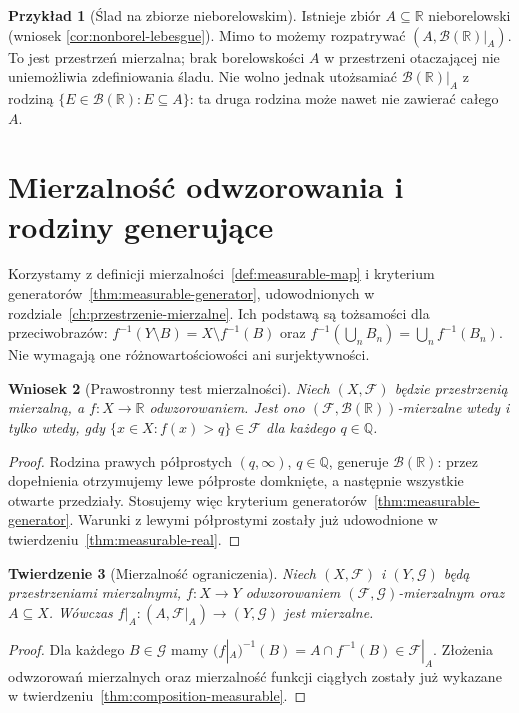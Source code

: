 \documentclass[11pt,a4paper,oneside]{book}
\numberwithin{equation}{chapter}
\theoremstyle{plain}
\newtheorem{twierdzenie}{Twierdzenie}[chapter]
\newtheorem{wniosek}[twierdzenie]{Wniosek}
\theoremstyle{definition}
\newtheorem{przyklad}[twierdzenie]{Przykład}
\theoremstyle{remark}
\begin{document}
\begin{przyklad}[Ślad na zbiorze nieborelowskim]
Istnieje zbiór $A\subseteq\mathbb R$ nieborelowski
(wniosek \ref{cor:nonborel-lebesgue}). Mimo to możemy
rozpatrywać $(A,\mathcal B(\mathbb R)|_A)$.
To jest przestrzeń mierzalna; brak borelowskości $A$
w przestrzeni otaczającej nie uniemożliwia
zdefiniowania śladu. Nie wolno jednak utożsamiać
$\mathcal B(\mathbb R)|_A$ z rodziną
$\{E\in\mathcal B(\mathbb R):E\subseteq A\}$:
ta druga rodzina może nawet nie zawierać całego $A$.
\end{przyklad}

\section{Mierzalność odwzorowania i rodziny generujące}

Korzystamy z definicji mierzalności~\ref{def:measurable-map} i kryterium generatorów~\ref{thm:measurable-generator}, udowodnionych w rozdziale~\ref{ch:przestrzenie-mierzalne}. Ich podstawą są tożsamości dla przeciwobrazów: $f^{-1}(Y\setminus B)=X\setminus f^{-1}(B)$ oraz $f^{-1}(\bigcup_n B_n)=\bigcup_n f^{-1}(B_n)$. Nie wymagają one różnowartościowości ani surjektywności.

\begin{wniosek}[Prawostronny test mierzalności]
\label{cor:real-borel-tests}
Niech $(X,\mathcal F)$ będzie przestrzenią mierzalną,
a $f:X\to\mathbb R$ odwzorowaniem. Jest ono
$(\mathcal F,\mathcal B(\mathbb R))$-mierzalne wtedy i tylko
wtedy, gdy $\{x\in X:f(x)>q\}\in\mathcal F$
dla każdego $q\in\mathbb Q$.
\end{wniosek}
\begin{proof}
Rodzina prawych półprostych $(q,\infty)$, $q\in\mathbb Q$,
generuje $\mathcal B(\mathbb R)$: przez dopełnienia
otrzymujemy lewe półproste domknięte, a następnie
wszystkie otwarte przedziały. Stosujemy więc
kryterium generatorów~\ref{thm:measurable-generator}.
Warunki z lewymi półprostymi zostały już udowodnione
w twierdzeniu~\ref{thm:measurable-real}.
\end{proof}

\begin{twierdzenie}[Mierzalność ograniczenia]
\label{thm:restriction-meas-5}
Niech $(X,\mathcal F)$ i $(Y,\mathcal G)$ będą przestrzeniami
mierzalnymi, $f:X\to Y$ odwzorowaniem
$(\mathcal F,\mathcal G)$-mierzalnym oraz $A\subseteq X$.
Wówczas $f|_A:(A,\mathcal F|_A)\to(Y,\mathcal G)$ jest mierzalne.
\end{twierdzenie}
\begin{proof}
Dla każdego $B\in\mathcal G$ mamy
$(f|_A)^{-1}(B)=A\cap f^{-1}(B)\in\mathcal F|_A$.
Złożenia odwzorowań mierzalnych oraz mierzalność funkcji
ciągłych zostały już wykazane w twierdzeniu~\ref{thm:composition-measurable}.
\end{proof}
\end{document}
